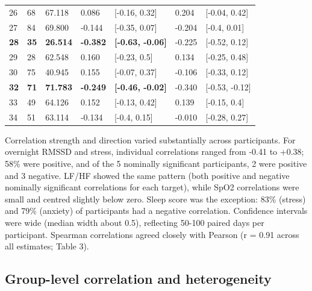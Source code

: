 \documentclass[11pt, a4paper, oneside]{article}
\begin{document}
\begin{table}[H]
\begin{tabularx}{\textwidth}{XXXXXXX}
        26  & 68   & 67.118  & 0.086 & [-0.16, 0.32] & 0.204 & [-0.04, 0.42]\\
        27  & 84   & 69.800   & -0.144& [-0.35, 0.07] & -0.204 & [-0.4, 0.01]\\
        \textbf{28}  & \textbf{35}   & \textbf{26.514}  & \textbf{-0.382}& \textbf{[-0.63, -0.06]} & -0.225 & [-0.52, 0.12]\\
        29  & 28   & 62.548  & 0.160 & [-0.23, 0.5] & 0.134 & [-0.25, 0.48]\\
        30  & 75   & 40.945  & 0.155 & [-0.07, 0.37] & -0.106 & [-0.33, 0.12]\\
        \textbf{32}  & \textbf{71}   & \textbf{71.783}  &\textbf{-0.249}& \textbf{[-0.46, -0.02]} & -0.340 &[-0.53, -0.12]\\
        33  & 49   & 64.126    & 0.152 & [-0.13, 0.42] & 0.139 & [-0.15, 0.4]\\
        34  & 51   & 63.114  & -0.134& [-0.4, 0.15] & -0.010 & [-0.28, 0.27]\\
        \bottomrule
    \end{tabularx}
    \label{tab:Table_3}
\end{table}

Correlation strength and direction varied substantially across participants. For overnight RMSSD and stress, individual correlations ranged from -0.41 to +0.38; 58\% were positive, and of the 5 nominally significant participants, 2 were positive and 3 negative. LF/HF showed the same pattern (both positive and negative nominally significant correlations for each target), while SpO2 correlations were small and centred slightly below zero. Sleep score was the exception: 83\% (stress) and 79\% (anxiety) of participants had a negative correlation. Confidence intervals were wide (median width about 0.5), reflecting 50-100 paired days per participant. Spearman correlations agreed closely with Pearson (r = 0.91 across all estimates; Table 3).

\subsection{Group-level correlation and heterogeneity}
\end{document}
